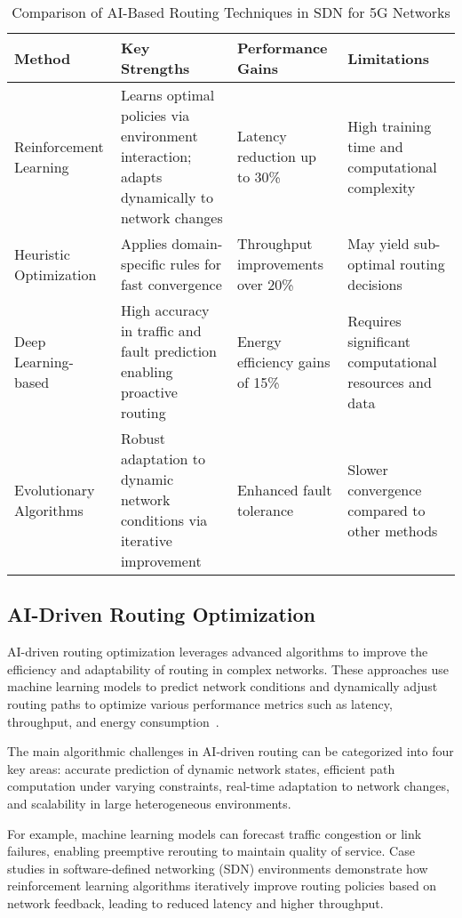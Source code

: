 \documentclass[sigconf]{acmart}
\begin{document}
\begin{table*}[htbp]
\centering
\caption{Comparison of AI-Based Routing Techniques in SDN for 5G Networks}
\label{tab:ai-routing-comparison}
\begin{adjustbox}{max width=\textwidth}
\begin{tabular}{@{}llll@{}}
\toprule
\textbf{Method} & \textbf{Key Strengths} & \textbf{Performance Gains} & \textbf{Limitations} \\
\midrule
Reinforcement Learning & Learns optimal policies via environment interaction; adapts dynamically to network changes & Latency reduction up to 30\% & High training time and computational complexity \\
Heuristic Optimization & Applies domain-specific rules for fast convergence & Throughput improvements over 20\% & May yield sub-optimal routing decisions \\
Deep Learning-based & High accuracy in traffic and fault prediction enabling proactive routing & Energy efficiency gains of 15\% & Requires significant computational resources and data \\
Evolutionary Algorithms & Robust adaptation to dynamic network conditions via iterative improvement & Enhanced fault tolerance & Slower convergence compared to other methods \\
\bottomrule
\end{tabular}
\end{adjustbox}
\end{table*}

\subsection{AI-Driven Routing Optimization}

AI-driven routing optimization leverages advanced algorithms to improve the efficiency and adaptability of routing in complex networks. These approaches use machine learning models to predict network conditions and dynamically adjust routing paths to optimize various performance metrics such as latency, throughput, and energy consumption~\cite{}.

The main algorithmic challenges in AI-driven routing can be categorized into four key areas: accurate prediction of dynamic network states, efficient path computation under varying constraints, real-time adaptation to network changes, and scalability in large heterogeneous environments.

For example, machine learning models can forecast traffic congestion or link failures, enabling preemptive rerouting to maintain quality of service. Case studies in software-defined networking (SDN) environments demonstrate how reinforcement learning algorithms iteratively improve routing policies based on network feedback, leading to reduced latency and higher throughput.
\end{document}
